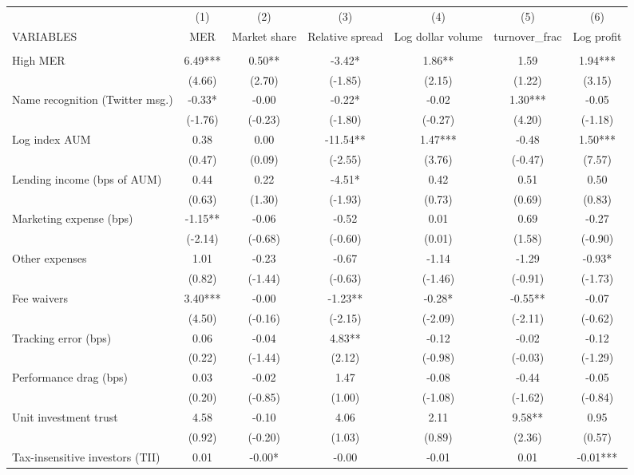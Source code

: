 \documentclass[]{article}
\begin{document}
\begin{tabular}{lcccccc} \hline
 & (1) & (2) & (3) & (4) & (5) & (6) \\
VARIABLES & MER & Market share & Relative spread & Log dollar volume & turnover\_frac & Log profit \\ \hline
 &  &  &  &  &  &  \\
High MER & 6.49*** & 0.50** & -3.42* & 1.86** & 1.59 & 1.94*** \\
 & (4.66) & (2.70) & (-1.85) & (2.15) & (1.22) & (3.15) \\
Name recognition (Twitter msg.) & -0.33* & -0.00 & -0.22* & -0.02 & 1.30*** & -0.05 \\
 & (-1.76) & (-0.23) & (-1.80) & (-0.27) & (4.20) & (-1.18) \\
Log index AUM & 0.38 & 0.00 & -11.54** & 1.47*** & -0.48 & 1.50*** \\
 & (0.47) & (0.09) & (-2.55) & (3.76) & (-0.47) & (7.57) \\
Lending income (bps of AUM) & 0.44 & 0.22 & -4.51* & 0.42 & 0.51 & 0.50 \\
 & (0.63) & (1.30) & (-1.93) & (0.73) & (0.69) & (0.83) \\
Marketing expense (bps) & -1.15** & -0.06 & -0.52 & 0.01 & 0.69 & -0.27 \\
 & (-2.14) & (-0.68) & (-0.60) & (0.01) & (1.58) & (-0.90) \\
Other expenses & 1.01 & -0.23 & -0.67 & -1.14 & -1.29 & -0.93* \\
 & (0.82) & (-1.44) & (-0.63) & (-1.46) & (-0.91) & (-1.73) \\
Fee waivers & 3.40*** & -0.00 & -1.23** & -0.28* & -0.55** & -0.07 \\
 & (4.50) & (-0.16) & (-2.15) & (-2.09) & (-2.11) & (-0.62) \\
Tracking error (bps) & 0.06 & -0.04 & 4.83** & -0.12 & -0.02 & -0.12 \\
 & (0.22) & (-1.44) & (2.12) & (-0.98) & (-0.03) & (-1.29) \\
Performance drag (bps) & 0.03 & -0.02 & 1.47 & -0.08 & -0.44 & -0.05 \\
 & (0.20) & (-0.85) & (1.00) & (-1.08) & (-1.62) & (-0.84) \\
Unit investment trust & 4.58 & -0.10 & 4.06 & 2.11 & 9.58** & 0.95 \\
 & (0.92) & (-0.20) & (1.03) & (0.89) & (2.36) & (0.57) \\
Tax-insensitive investors (TII) & 0.01 & -0.00* & -0.00 & -0.01 & 0.01 & -0.01*** \\

\end{tabular}
\end{document}
